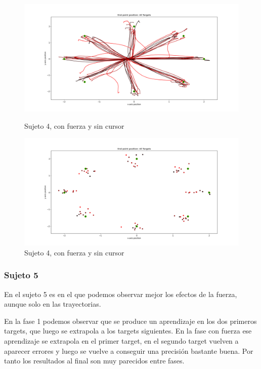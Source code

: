 \documentclass[a4paper,11pt, oneside]{book}
\begin{document}
\begin{figure}[H]
	\begin{minipage}[b]{0.5\linewidth}
		\centering
		\includegraphics[width=\linewidth]{sujeto4/force_no_cursor/trayectorias}
		\caption{Sujeto 4, con fuerza y sin cursor}
		\label{fig:figura1}
	\end{minipage}
	\hspace{0.5cm}
	\begin{minipage}[b]{0.5\linewidth}
		\centering
		\includegraphics[width=\linewidth]{sujeto4/force_no_cursor/trayectorias_puntos}
		\caption{Sujeto 4, con fuerza y sin cursor}
		\label{fig:figura2}
	\end{minipage}
\end{figure}



\subsubsection{Sujeto 5}

En el sujeto 5 es en el que podemos observar mejor los efectos de la fuerza, aunque solo en las trayectorias.

En la fase 1 podemos observar que se produce un aprendizaje en los dos primeros targets, que luego se extrapola a los targets siguientes. En la fase con fuerza ese aprendizaje se extrapola en el primer target, en el segundo target vuelven a aparecer errores y luego se vuelve a conseguir una precisión bastante buena. Por tanto los resultados al final son muy parecidos entre fases. 
\end{document}
